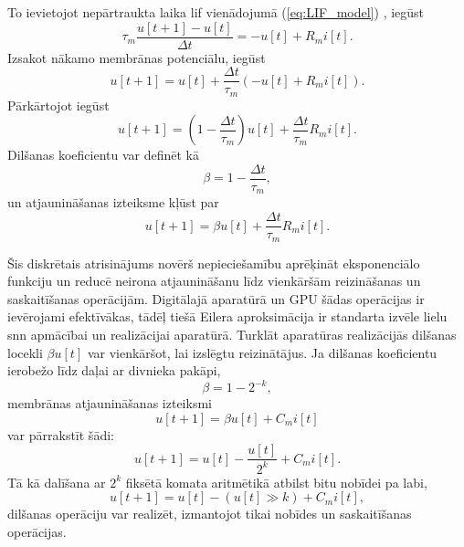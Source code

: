 To ievietojot nepārtraukta laika \Gls{lif} vienādojumā (\ref{eq:LIF_model}) \cite{guo2022, Fang2021}, iegūst
\begin{equation}
    \tau_m \frac{u[t+1] - u[t]}{\Delta t} = - u[t] + R_m i[t].
\end{equation}
Izsakot nākamo membrānas potenciālu, iegūst
\begin{equation}
    u[t+1] = u[t] + \frac{\Delta t}{\tau_m} \left(-u[t] + R_m i[t] \right).
\end{equation}
Pārkārtojot iegūst
\begin{equation}
    u[t+1] = \left(1 - \frac{\Delta t}{\tau_m}\right) u[t] + \frac{\Delta t}{\tau_m} R_m i[t].
\end{equation}
Dilšanas koeficientu var definēt kā
\begin{equation}
    \beta = 1 - \frac{\Delta t}{\tau_m},
\end{equation}
un atjaunināšanas izteiksme kļūst par
\begin{equation}
    u[t+1] = \beta u[t] + \frac{\Delta t}{\tau_m} R_m i[t].
    \label{eq:LIF_euler}
\end{equation}

Šis diskrētais atrisinājums novērš nepieciešamību aprēķināt eksponenciālo funkciju un reducē neirona atjaunināšanu līdz vienkāršām reizināšanas un saskaitīšanas operācijām. Digitālajā aparatūrā un GPU šādas operācijas ir ievērojami efektīvākas, tādēļ tiešā Eilera aproksimācija ir standarta izvēle lielu \Gls{snn} apmācībai un realizācijai aparatūrā. Turklāt aparatūras realizācijās dilšanas locekli $\beta u[t]$ var vienkāršot, lai izslēgtu reizinātājus. Ja dilšanas koeficientu ierobežo līdz daļai ar divnieka pakāpi,
\begin{equation}
    \beta = 1 - 2^{-k},
    \label{eq:quant_beta}
\end{equation}
membrānas atjaunināšanas izteiksmi
\begin{equation}
    u[t+1] = \beta u[t] + C_m i[t]
\end{equation}
var pārrakstīt šādi:
\begin{equation}
    u[t+1] = u[t] - \frac{u[t]}{2^k} + C_m i[t].
\end{equation}
Tā kā dalīšana ar $2^k$ fiksētā komata aritmētikā atbilst bitu nobīdei pa labi,
\begin{equation}
    u[t+1] = u[t] - (u[t] \gg k) + C_m i[t],
\end{equation}
dilšanas operāciju var realizēt, izmantojot tikai nobīdes un saskaitīšanas operācijas.


